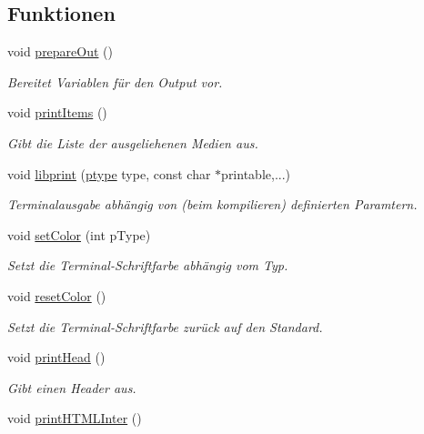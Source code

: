\subsection*{Funktionen}
\begin{DoxyCompactItemize}
\item 
void \hyperlink{group___lend_lib_out_gae6bfc3bcebb80e387b4ad8a773496437}{prepare\+Out} ()
\begin{DoxyCompactList}\small\item\em Bereitet Variablen für den Output vor. \end{DoxyCompactList}\item 
void \hyperlink{group___lend_lib_out_ga83cb01db1bc577a2e4a54cbe62773c17}{print\+Items} ()\hypertarget{group___lend_lib_out_ga83cb01db1bc577a2e4a54cbe62773c17}{}\label{group___lend_lib_out_ga83cb01db1bc577a2e4a54cbe62773c17}

\begin{DoxyCompactList}\small\item\em Gibt die Liste der ausgeliehenen Medien aus. \end{DoxyCompactList}\item 
void \hyperlink{group___lend_lib_out_ga152ba05f7c1a27f69bd9c243359609c6}{libprint} (\hyperlink{group___lend_lib_out_ga0916607956575302a93dbd21440edc1a}{ptype} type, const char $\ast$printable,...)
\begin{DoxyCompactList}\small\item\em Terminalausgabe abhängig von (beim kompilieren) definierten Paramtern. \end{DoxyCompactList}\item 
void \hyperlink{group___lend_lib_out_ga1b5f37b5e6ac0f38b6933a16e0460579}{set\+Color} (int p\+Type)
\begin{DoxyCompactList}\small\item\em Setzt die Terminal-\/\+Schriftfarbe abhängig vom Typ. \end{DoxyCompactList}\item 
void \hyperlink{group___lend_lib_out_gafe00396766eb6b8ca4674de4c5d3d949}{reset\+Color} ()
\begin{DoxyCompactList}\small\item\em Setzt die Terminal-\/\+Schriftfarbe zurück auf den Standard. \end{DoxyCompactList}\item 
void \hyperlink{group___lend_lib_out_ga903241157072885e802dea85fc6a976c}{print\+Head} ()
\begin{DoxyCompactList}\small\item\em Gibt einen Header aus. \end{DoxyCompactList}\item 
void \hyperlink{group___lend_lib_out_ga6f008e199b4cc5c47c6d85367cc5bda2}{print\+H\+T\+M\+L\+Inter} ()\hypertarget{group___lend_lib_out_ga6f008e199b4cc5c47c6d85367cc5bda2}{}\label{group___lend_lib_out_ga6f008e199b4cc5c47c6d85367cc5bda2}


\end{DoxyCompactItemize}

